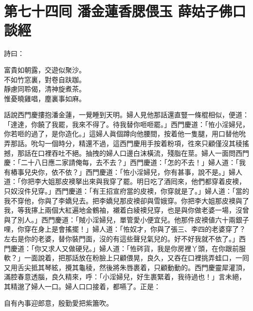 
\chapter*{第七十四囘 潘金蓮香腮偎玉 薛姑子佛口談經}


詩曰：

\begin{myquote}
富貴如朝露，交遊似聚沙。\\不如竹窓裏，對卷自趺跏。\\靜慮同聆偈，清神旋煮茶。\\惟憂曉雞唱，塵裏事如麻。
\end{myquote}

話說西門慶摟抱潘金蓮，一覺睡到天明。婦人見他那話還直豎一條棍相似，便道：「達達，你饒了我罷，我來不得了。{}待我替你咂咂罷。」西門慶道：「恠小淫婦兒，你若咂的過了，是你造化。」這婦人眞個蹲向他腰間，按着他一隻腿，用口替他吮弄那話。吮勾一個時分，精還不過，這西門慶用手按着粉項，徃來只顧僅沒其稜搖撼，那話在口裡吞吐不絕。抽拽的婦人口邊白沫橫流，殘脂在莖。婦人一面問西門慶：「二十八日應二家請俺每，去不去？」西門慶道：「怎的不去！」婦人道：「我有樁事兒央你，依不依？」{}西門慶道：「恠小淫婦兒，你有甚事，說不是。」婦人道：「你把李大姐那皮襖拏出來與我穿了罷。明日吃了酒囘來，他們都穿着皮襖，只奴沒件兒穿。」西門慶道：「有王招宣府當的皮襖，你穿就是了。」婦人道：「當的我不穿他，你與了李嬌兒去。把李嬌兒那皮襖卻與雪娥穿。你把李大姐那皮襖與了我，等我㩟上兩個大紅遍地金鶴袖，襯着白綾襖兒穿，也是與你做老婆一場，沒曾與了別人。」{}西門慶道：「賊小淫婦兒，單管愛小便宜兒。他那件皮襖値六十兩銀子哩，你穿在身上是會搖擺！」婦人道：「恠奴才，你與了張三、李四的老婆穿了？左右是你的老婆，替你裝門面，沒的有這些聲兒氣兒的。好不好我就不依了。」西門慶道：「你又求人又做硬兒。」婦人道：「恠硶貨，我是你房裡丫頭，在你跟前服軟？」一面說着，把那話放在粉臉上只顧偎晃，良久，又吞在口裡挑弄蛙口，一囘又用舌尖抵其琴絃，攪其龜稜，然後將朱唇裹着，只顧動動的。西門慶靈犀灌頂，滿腔春意透腦，良久精來，呼：「小淫婦兒，好生裹緊着，我待過也！」言未絕，其精邈了婦人一口。婦人口口接着，都嚥了。正是：

\begin{myquote}
自有內事迎郎意，殷勤愛把紫簫吹。
\end{myquote}

